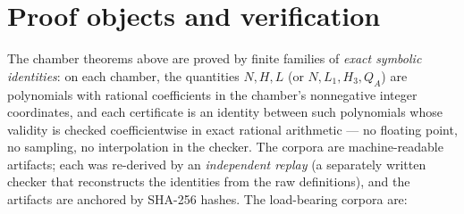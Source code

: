 \documentclass[11pt]{article}
\theoremstyle{definition}
\theoremstyle{remark}
\begin{document}
\section{Proof objects and verification}\label{sec:proofobjects}
The chamber theorems above are proved by finite families of \emph{exact symbolic
identities}: on each chamber, the quantities $N,H,L$ (or $N,L_1,H_3,Q_A$) are
polynomials with rational coefficients in the chamber's nonnegative integer coordinates,
and each certificate is an identity between such polynomials whose validity is checked
coefficientwise in exact rational arithmetic --- no floating point, no sampling, no
interpolation in the checker. The corpora are machine-readable artifacts; each was
re-derived by an \emph{independent replay} (a separately written checker that
reconstructs the identities from the raw definitions), and the artifacts are anchored by
SHA-256 hashes. The load-bearing corpora are:
\end{document}
